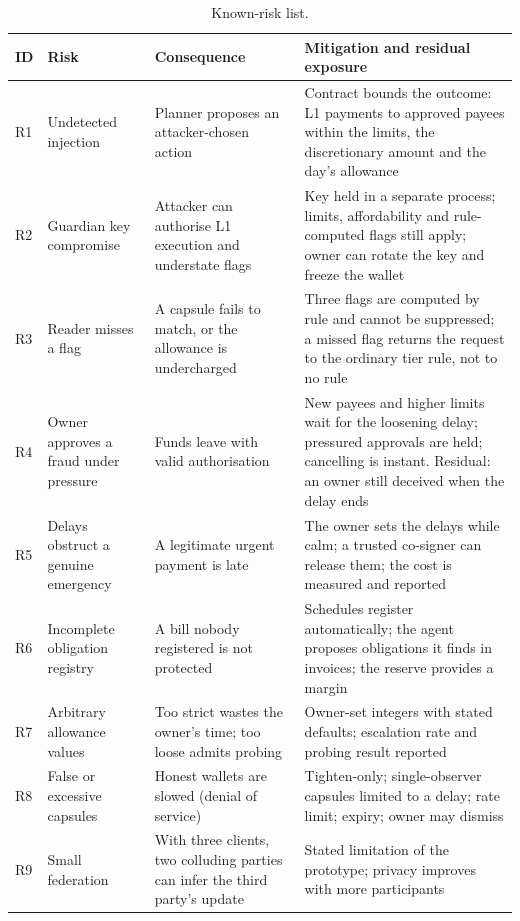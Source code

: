\documentclass[10pt,a4paper,twocolumn]{article}
\newcommand{\tblfont}{\footnotesize}
\begin{document}
\begin{table}[t]
\caption{Known-risk list.}
\label{tab:risks}
\tblfont
\begin{tabularx}{\textwidth}{@{}P{0.04\textwidth} P{0.20\textwidth} L L@{}}
\toprule
\textbf{ID} & \textbf{Risk} & \textbf{Consequence} & \textbf{Mitigation and residual exposure} \\
\midrule
R1 & Undetected injection & Planner proposes an attacker-chosen action &
Contract bounds the outcome: L1 payments to approved payees within the limits, the discretionary amount and the day's allowance \\
R2 & Guardian key compromise & Attacker can authorise L1 execution and understate flags &
Key held in a separate process; limits, affordability and rule-computed flags still apply; owner can rotate the key and freeze the wallet \\
R3 & Reader misses a flag & A capsule fails to match, or the allowance is undercharged &
Three flags are computed by rule and cannot be suppressed; a missed flag returns the request to the ordinary tier rule, not to no rule \\
R4 & Owner approves a fraud under pressure & Funds leave with valid authorisation &
New payees and higher limits wait for the loosening delay; pressured approvals are held; cancelling is instant. Residual: an owner still deceived when the delay ends \\
R5 & Delays obstruct a genuine emergency & A legitimate urgent payment is late &
The owner sets the delays while calm; a trusted co-signer can release them; the cost is measured and reported \\
R6 & Incomplete obligation registry & A bill nobody registered is not protected &
Schedules register automatically; the agent proposes obligations it finds in invoices; the reserve provides a margin \\
R7 & Arbitrary allowance values & Too strict wastes the owner's time; too loose admits probing &
Owner-set integers with stated defaults; escalation rate and probing result reported \\
R8 & False or excessive capsules & Honest wallets are slowed (denial of service) &
Tighten-only; single-observer capsules limited to a delay; rate limit; expiry; owner may dismiss \\
R9 & Small federation & With three clients, two colluding parties can infer the third party's update &
Stated limitation of the prototype; privacy improves with more participants \\

\end{tabularx}
\end{table}
\end{document}
